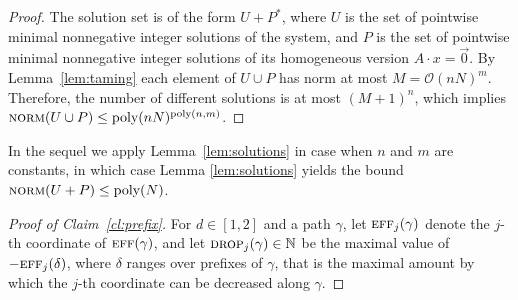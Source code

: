 \documentclass[a4paper, UKenglish, cleveref, autoref, thm-restate]{lipics-v2021}
\newcommand{\Oo}{\mathcal{O}}
\newcommand{\N}{\mathbb{N}}
\newcommand{\norm}{\textsc{norm}}
\newcommand{\eff}{\textsc{eff}}
\newcommand{\drop}{\textsc{drop}}
\newcommand{\poly}{\textup{poly}}
\renewcommand{\vec}[1]{\overrightarrow{#1}}
\newcommand{\setfromto}[2]{[#1, #2]}
\newcommand{\setto}[1]{\setfromto 1 {#1}}
\begin{document}
\begin{appendixproof}
\begin{proof}
The solution set is of the form $U+P^*$,
where $U$ is the set of pointwise minimal nonnegative integer solutions of the system,
and $P$ is the set of pointwise minimal nonnegative integer solutions of its homogeneous version
$A\cdot x = \vec 0$.
By Lemma~\ref{lem:taming} each element of $U \cup P$ has norm at most $M= \Oo(nN)^m$.
Therefore, the number of different solutions is at most $(M+1)^n$, which implies 
$\norm(U \cup P) \leq \poly(nN)^{\poly(n,m)}$.
\end{proof}
In the sequel we apply Lemma~\ref{lem:solutions} in case when $n$ and $m$ are constants,
in which case Lemma \ref{lem:solutions} yields the bound $\norm(U+P) \leq \poly(N)$.

\begin{proof}[Proof of Claim~\ref{cl:prefix}]
For $d \in \setto 2$ and
a path $\gamma$, let $\eff_j(\gamma)$ denote the $j$-th coordinate of $\eff(\gamma)$, and
let $\drop_j(\gamma)\in\N$ be the maximal value of $-\eff_j(\delta)$, where $\delta$ ranges over prefixes of $\gamma$,
that is  the maximal amount by which the $j$-th coordinate can be decreased along $\gamma$.


\end{proof}
\end{appendixproof}
\end{document}
